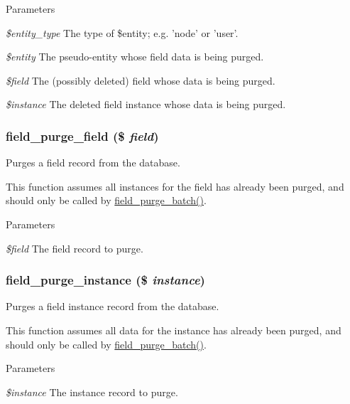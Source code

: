 \begin{DoxyParams}{Parameters}
\item[{\em \$entity\_\-type}]The type of \$entity; e.g. 'node' or 'user'. \item[{\em \$entity}]The pseudo-\/entity whose field data is being purged. \item[{\em \$field}]The (possibly deleted) field whose data is being purged. \item[{\em \$instance}]The deleted field instance whose data is being purged. \end{DoxyParams}
\hypertarget{group__field__purge_gac52122a65da997921f3a6a8f45deddbf}{
\subsubsection[{field\_\-purge\_\-field}]{\setlength{\rightskip}{0pt plus 5cm}field\_\-purge\_\-field (\$ {\em field})}}
\label{group__field__purge_gac52122a65da997921f3a6a8f45deddbf}
Purges a field record from the database.

This function assumes all instances for the field has already been purged, and should only be called by \hyperlink{group__field__purge_gac0dcacb53338e25ac4e2add6b427757e}{field\_\-purge\_\-batch()}.


\begin{DoxyParams}{Parameters}
\item[{\em \$field}]The field record to purge. \end{DoxyParams}
\hypertarget{group__field__purge_ga766cee439c7c920d3d406c7af41c8968}{
\subsubsection[{field\_\-purge\_\-instance}]{\setlength{\rightskip}{0pt plus 5cm}field\_\-purge\_\-instance (\$ {\em instance})}}
\label{group__field__purge_ga766cee439c7c920d3d406c7af41c8968}
Purges a field instance record from the database.

This function assumes all data for the instance has already been purged, and should only be called by \hyperlink{group__field__purge_gac0dcacb53338e25ac4e2add6b427757e}{field\_\-purge\_\-batch()}.


\begin{DoxyParams}{Parameters}
\item[{\em \$instance}]The instance record to purge. \end{DoxyParams}
